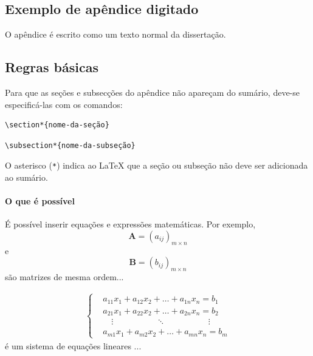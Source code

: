 \postextual




\begin{apendicesenv}

\chapter{Exemplo de apêndice digitado}

O apêndice é escrito como um texto normal da dissertação.

\section*{Regras básicas}

Para que as seções e subsecções  do apêndice não apareçam do sumário, deve-se especificá-las com os comandos:
\begin{verbatim}
\section*{nome-da-seção}
\end{verbatim}

\begin{verbatim}
\subsection*{nome-da-subseção}
\end{verbatim}

O asterisco (\verb!*!) indica ao LaTeX que a seção ou subseção não deve ser adicionada ao sumário.

\subsubsection*{O que é possível}

É possível inserir equações e expressões matemáticas. Por exemplo,
$$\textbf{A} = \left(a_{ij}\right)_{m \times n}$$ 
e  
$$\textbf{B} = \left(b_{ij}\right)_{m \times n}$$ 
são matrizes de mesma ordem...

		\begin{eqnarray*}
		\left\lbrace
		\begin{aligned}
		&a_{11}x_1+a_{12}x_2 + \ldots + a_{1n}x_n = b_1\\
		&a_{21}x_1+a_{22}x_2 + \ldots + a_{2n}x_n = b_2\\
		&\quad \vdots \quad \qquad \qquad \ddots  \quad \qquad \qquad \vdots\\
		&a_{m1}x_1+a_{m2}x_2 + \ldots + a_{mn}x_n = b_m
		\end{aligned}
		\right.
		\end{eqnarray*}
		é um sistema de equações lineares ...
		

\end{apendicesenv}
